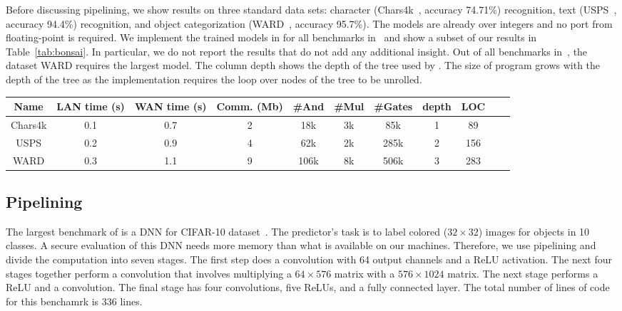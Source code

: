 Before discussing pipelining, we show \bonsai results on three standard data sets: character  (Chars4k~\cite{campos}, accuracy 74.71\%) recognition, text (USPS~\cite{hull}, accuracy 94.4\%) recognition, and object categorization (WARD~\cite{yang}, accuracy 95.7\%). 
The \bonsai models are already over integers and no port from floating-point is required.
We implement the trained models in \tool for all benchmarks in~\cite{bonsai}
and show a subset of our results in Table~\ref{tab:bonsai}.
In particular, we do not report the results that do not add any additional insight.
Out of all benchmarks in~\cite{bonsai}, the dataset WARD requires the largest model.
The column depth shows the depth of the tree used by \bonsai. The size of \tool
program grows with the depth of the tree as the \tool implementation requires the
loop over nodes of the tree to be unrolled. 


\begin{table*}
\begin{tabular}{c|c|c|c |c|c|c|c|c|c | c}
Name       & LAN time (s) & WAN time (s) & Comm. (Mb)  & \#And & \#Mul & \#Gates & depth & LOC\\
\hline
Chars4k    &  0.1         & 0.7         & 2            & 18k    & 3k    &  85k     & 1   & 89\\
\hline
USPS       &  0.2         & 0.9         & 4            & 62k    & 2k    &  285k    & 2   & 156\\
\hline
WARD       &  0.3         & 1.1         & 9            & 106k    & 8k    &  506k    & 3   & 283\\
\hline
\end{tabular}

 \caption{Bonsai benchmarks}
 \label{tab:bonsai} 
\end{table*}

\subsection{Pipelining}
\label{sec:pipeeval}
The largest benchmark of \minion is a DNN for CIFAR-10 dataset~\cite{cifar}.
The predictor's task is to label colored ($32\times 32$) images for objects in 10 classes. A secure evaluation of this DNN needs more memory than what is available
on our machines. Therefore, we use pipelining and divide the computation into seven stages.
The first step does a convolution with 64 output channels and a ReLU activation.
The next four stages together perform a convolution that involves multiplying a $64\times 576$ matrix with a
$576\times 1024$ matrix. The next stage performs a ReLU and a convolution.
The final stage has four convolutions, five ReLUs, and a fully connected layer.
The total number of lines of \tool code for this benchamrk is 336 lines.


